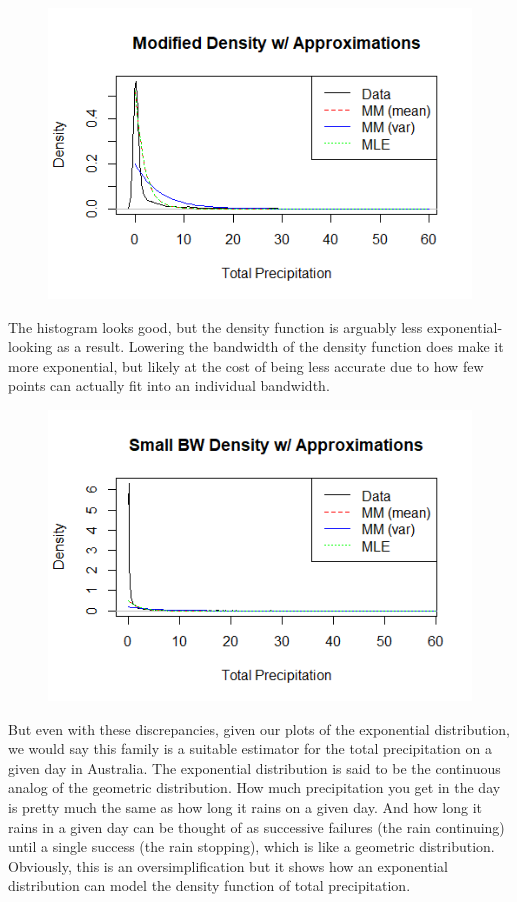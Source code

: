 \documentclass[12pt, a4paper, oneside]{report}
\begin{document}
\begin{figure}[h]
  \centering
  \includegraphics[width=0.8\linewidth]{expDensityModifiedA.png}
\end{figure}

\newpage
The histogram looks good, but the density function is arguably less exponential-looking as a result. Lowering the bandwidth of the density function does make it more exponential, but likely at the cost of being less accurate due to how few points can actually fit into an individual bandwidth. 


\begin{figure}[h]
  \centering
  \includegraphics[width=0.8 \linewidth]{expDensitySmallA.png} %
\end{figure}


But even with these discrepancies, given our plots of the exponential distribution, we would say this family is a suitable estimator for the total precipitation on a given day in Australia. The exponential distribution is said to be the continuous analog of the geometric distribution. How much precipitation you get in the day is pretty much the same as how long it rains on a given day. And how long it rains in a given day can be thought of as successive failures (the rain continuing) until a single success (the rain stopping), which is like a geometric distribution. Obviously, this is an oversimplification but it shows how an exponential distribution can model the density function of total precipitation.
\end{document}
